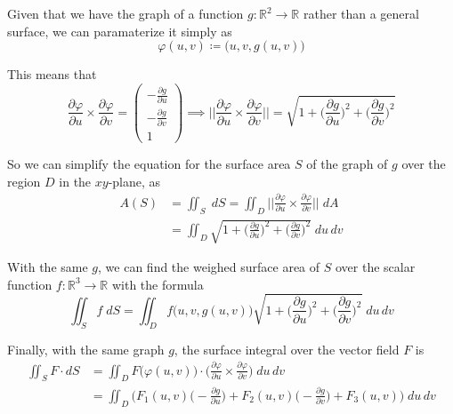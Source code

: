 	\begin{theorem}
	  \label{thm:surface-integral-formula-for-graphs}
		Given that we have the graph of a function $g: \mathbb{R}^2 \to \mathbb{R}$ rather than a general surface, we can paramaterize it simply as
		\begin{equation}
			\varphi(u, v) \coloneqq \big(u, v, g(u, v) \big)
		\end{equation}
		
		This means that 
		\begin{equation}
			\frac{\partial \varphi}{\partial u} \times \frac{\partial \varphi}{\partial v} = 
			\begin{pmatrix}
			-\frac{\partial g}{\partial u} \\ -\frac{\partial g}{\partial v} \\ 1
			\end{pmatrix} \implies \bigg|\bigg|\frac{\partial \varphi}{\partial u} \times \frac{\partial \varphi}{\partial v} \bigg|\bigg| = \sqrt{1 + \Big(\frac{\partial g}{\partial u}\Big)^2 + \Big( \frac{\partial g}{\partial v}\Big)^2}
		\end{equation}
		
		So we can simplify the equation for the surface area $S$ of the graph of $g$ over the region $D$ in the $x y$-plane, as 
		\begin{align}
			A(S) & = \iint_S \; d S = \iint_D \bigg|\bigg|\frac{\partial \varphi}{\partial u} \times \frac{\partial \varphi}{\partial v} \bigg|\bigg| \; d A \\
			& = \iint_D \sqrt{1 + \Big(\frac{\partial g}{\partial u}\Big)^2 + \Big( \frac{\partial g}{\partial v}\Big)^2} \; d u \, d v
		\end{align}
		
		With the same $g$, we can find the weighed surface area of $S$ over the scalar function $f: \mathbb{R}^3 \to \mathbb{R}$ with the formula
		\begin{equation}
			\iint_S f \; d S = \iint_D f\big(u, v, g(u, v)\big) \sqrt{1 + \Big(\frac{\partial g}{\partial u}\Big)^2 + \Big( \frac{\partial g}{\partial v}\Big)^2} \; d u \, d v
		\end{equation}
		
		Finally, with the same graph $g$, the surface integral over the vector field $F$ is
		\begin{align}
			\iint_S F \cdot d S & = \iint_D F\big(\varphi(u, v)\big) \cdot \bigg( \frac{\partial \varphi}{\partial u} \times \frac{\partial \varphi}{\partial v}\bigg) \; d u \, d v \\
			& = \iint_D \bigg( F_1(u, v) \Big(- \frac{\partial g}{\partial u}\Big) + F_2 (u, v) \Big( - \frac{\partial g}{\partial v} \Big) + F_3 (u, v) \bigg) \; d u \, d v
		\end{align}
	\end{theorem}
		

